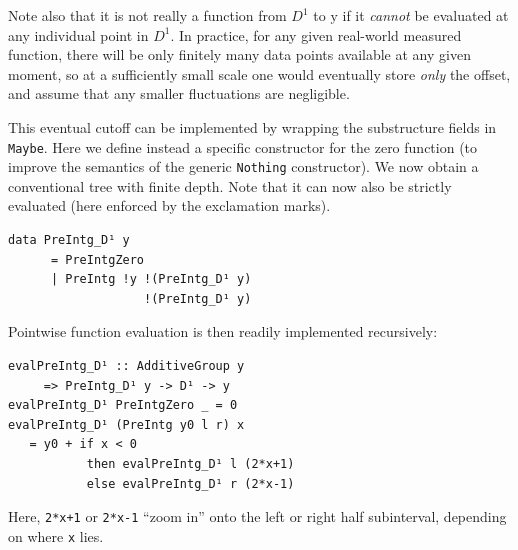 \documentclass[sigplan,screen]{acmart}
\theoremstyle{acmplain}
\theoremstyle{acmdefinition}
\begin{document}
Note also that it is not really a function from $D^1$ to $\mathrm{y}$ if it \emph{cannot} be evaluated at any individual point in $D^1$.
In practice, for any given real-world measured function, there will be only finitely many data points available at any given moment,
so at a sufficiently small scale one would eventually store \emph{only} the offset,
and assume that any smaller fluctuations are negligible.

This eventual cutoff can be implemented by wrapping the substructure fields in \lstinline`Maybe`.
Here we define instead a specific constructor for the zero function (to improve the semantics of the generic \lstinline`Nothing` constructor).
We now obtain a conventional tree with finite depth.
Note that it can now also be strictly evaluated (here enforced by the exclamation marks).
\begin{lstlisting}
data PreIntg_D¹ y
      = PreIntgZero
      | PreIntg !y !(PreIntg_D¹ y)
                   !(PreIntg_D¹ y)
\end{lstlisting}
Pointwise function evaluation is then readily implemented recursively:
\begin{lstlisting}
evalPreIntg_D¹ :: AdditiveGroup y
     => PreIntg_D¹ y -> D¹ -> y
evalPreIntg_D¹ PreIntgZero _ = 0
evalPreIntg_D¹ (PreIntg y0 l r) x
   = y0 + if x < 0
           then evalPreIntg_D¹ l (2*x+1)
           else evalPreIntg_D¹ r (2*x-1)
\end{lstlisting}
Here, \lstinline`2*x+1` or \lstinline`2*x-1` “zoom in” onto the left or right half subinterval, depending on where \lstinline`x` lies.
\end{document}
